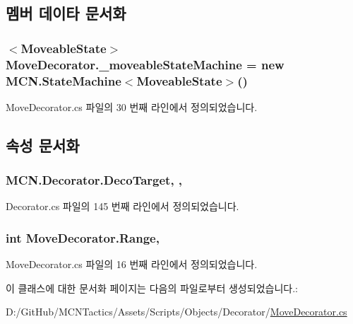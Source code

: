 \subsection{멤버 데이타 문서화}
\subsubsection[{\texorpdfstring{\+\_\+moveable\+State\+Machine}{_moveableStateMachine}}]{$<${\bf Moveable\+State}$>$ Move\+Decorator.\+\_\+moveable\+State\+Machine = new {\bf M\+C\+N.\+State\+Machine}$<${\bf Moveable\+State}$>$()\hspace{0.3cm}{\ttfamily [private]}}\hypertarget{class_move_decorator_a699616462ff8c3f628be94d157064c79}{}\label{class_move_decorator_a699616462ff8c3f628be94d157064c79}


Move\+Decorator.\+cs 파일의 30 번째 라인에서 정의되었습니다.



\subsection{속성 문서화}
\subsubsection[{\texorpdfstring{Deco\+Target}{DecoTarget}}]{ M\+C\+N.\+Decorator.\+Deco\+Target\hspace{0.3cm}{\ttfamily [get]}, {\ttfamily [protected]}, {\ttfamily [inherited]}}\hypertarget{class_m_c_n_1_1_decorator_a1306a0a8b814650cd5970a1ffc7ba2fe}{}\label{class_m_c_n_1_1_decorator_a1306a0a8b814650cd5970a1ffc7ba2fe}


Decorator.\+cs 파일의 145 번째 라인에서 정의되었습니다.

\subsubsection[{\texorpdfstring{Range}{Range}}]{\setlength{\rightskip}{0pt plus 5cm}int Move\+Decorator.\+Range\hspace{0.3cm}{\ttfamily [get]}, {\ttfamily [private]}}\hypertarget{class_move_decorator_aabb7a267f00c0ce5ad2d26e9daaa4b96}{}\label{class_move_decorator_aabb7a267f00c0ce5ad2d26e9daaa4b96}


Move\+Decorator.\+cs 파일의 16 번째 라인에서 정의되었습니다.



이 클래스에 대한 문서화 페이지는 다음의 파일로부터 생성되었습니다.\+:\begin{DoxyCompactItemize}
\item 
D\+:/\+Git\+Hub/\+M\+C\+N\+Tactics/\+Assets/\+Scripts/\+Objects/\+Decorator/\hyperlink{_move_decorator_8cs}{Move\+Decorator.\+cs}\end{DoxyCompactItemize}
